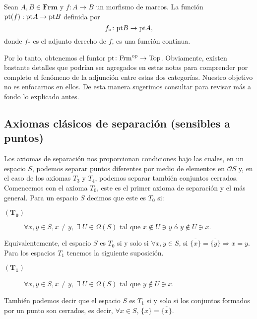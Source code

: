 \documentclass{comunicaciones}
\begin{document}
\begin{lem}
    Sean $A,B\in\mathbf{Frm}$ y $f\colon A\to B$ un morfismo de marcos. La función $\mathrm{pt}(f):\mathrm{pt} A\to \mathrm{pt} B$ definida por 
    \[
    f_*\colon \mathrm{pt} B\to \mathrm{pt} A,
    \]
    donde $f_*$ es el adjunto derecho de $f$, es una función continua.
    \end{lem}

Por lo tanto, obtenemos el funtor $\mathrm{pt}\colon \mathrm{Frm}^{\mathrm{op}}\to \mathrm{Top}$. Obviamente, existen bastante detalles que podrían ser agregados en estas notas para comprender por completo el fenómeno de la adjunción entre estas dos categorías. Nuestro objetivo no es enfocarnos en ellos. De esta manera sugerimos consultar \cite{A.Z.} para revisar más a fondo lo explicado antes. 

\subsection{Axiomas clásicos de separación (sensibles a puntos)}\label{Axiomas clasicos}
Los axiomas de separación nos proporcionan condiciones bajo las cuales, en un espacio $S$, podemos separar puntos diferentes por medio de elementos en $\mathcal{O}S$ y, en el caso de los axiomas $T_3$ y $T_4$, podemos separar también conjuntos cerrados.\\

Comencemos con el axioma \textbf{$T_0$}, este es el primer axioma de separación y el más general. Para un espacio $S$ decimos que este es $T_0$ si:

\begin{description}
\item[$(\mathbf{T_0})$] $\forall x, y\in S, x\neq y,\; \exists\; U\in \Omega (S) \mbox{ tal que } x\notin U \ni y \mbox{ ó } y\notin U \ni x.$
\end{description}

Equivalentemente, el espacio $S$ es $T_0$ si y solo si $\forall x,y\in S$, si $\overline{\{x\}}=\overline{\{y\}}\Rightarrow x=y$.\\

Para los espacios $T_1$ tenemos la siguiente suposición. 

\begin{description}
\item[$(\mathbf{T_1})$] $\forall x, y\in S, x\neq y,\; \exists\; U\in \Omega (S) \mbox{ tal que } y\notin U \ni x$.
\end{description}

También podemos decir que el espacio $S$ es $T_1$ si y solo si los conjuntos formados por un punto son cerrados, es decir, $\forall x\in S$, $\{x\}=\overline{\{x\}}$.\\
\end{document}
